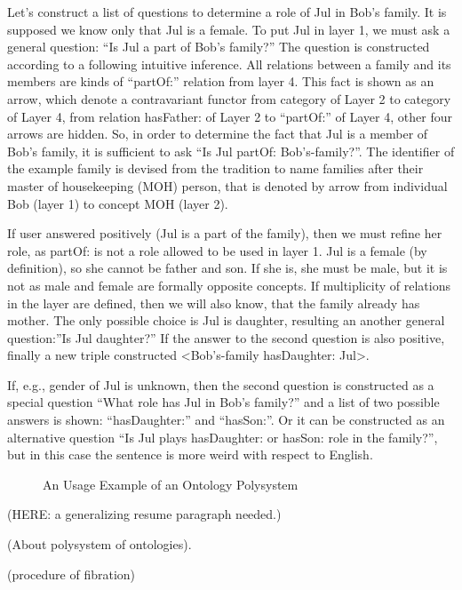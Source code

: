\documentclass[conference]{IEEEtran}
\begin{document}
Let's construct a list of questions to determine a role of Jul in Bob's family. It is supposed we know only that Jul is a female. To put Jul in layer 1, we must ask a general question: ``Is Jul a part of Bob's family?'' The question is constructed according to a following intuitive inference. All relations between a family and its members are kinds of ``partOf:'' relation from layer 4. This fact is shown as an arrow, which denote a contravariant functor from category of Layer 2 to category of Layer 4, from relation hasFather: of Layer 2 to ``partOf:'' of Layer 4, other four arrows are hidden. So, in order to determine the fact that Jul is a member of Bob's family, it is sufficient to ask ``Is Jul partOf: Bob's-family?''. The identifier of the example family is devised from the tradition to name families after their master of housekeeping (MOH) person, that is denoted by arrow from individual Bob (layer 1) to concept MOH (layer 2).

If user answered positively (Jul is a part of the family), then we must refine her role, as partOf: is not a role allowed to be used in layer 1. Jul is a female (by definition), so she cannot be father and son. If she is, she must be male, but it is not as male and female are formally opposite concepts. If multiplicity of relations in the layer are defined, then we will also know, that the family already has mother. The only possible choice is Jul is daughter, resulting an another general question:''Is Jul daughter?'' If the answer to the second question is also positive, finally a new triple constructed <Bob's-family hasDaughter: Jul>.

If, e.g., gender of Jul is unknown, then the second question is constructed as a special question ``What role has Jul in Bob's family?'' and a list of two possible answers is shown: ``hasDaughter:'' and ``hasSon:''. Or it can be constructed as an alternative question ``Is Jul plays hasDaughter: or hasSon: role in the family?'', but in this case the sentence is more weird with respect to English.

\begin{figure}
\centering\sf
\def\svgwidth{0.9\linewidth}

\caption{An  Usage Example of an Ontology Polysystem}
\label{OPSA}
\end{figure}



(HERE: a generalizing resume paragraph needed.)

(About polysystem of ontologies).

(procedure of fibration)
\end{document}
